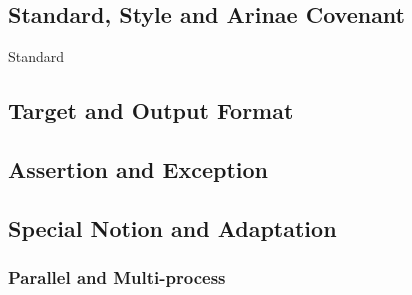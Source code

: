 \subsection{Standard, Style and Arinae Covenant}
{Standard}

\subsection{Target and Output Format}



\subsection{Assertion and Exception}

\subsection{Special Notion and Adaptation}

\subsubsection{Parallel and Multi-process}

